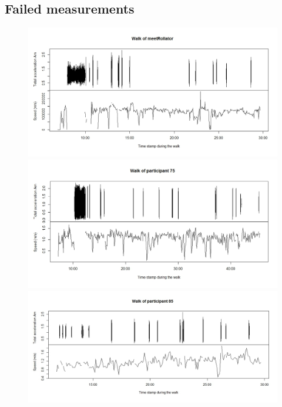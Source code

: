 \begin{appendix}
\clearpage

\section{Failed measurements}\label{Afailed}
\begin{figure}[H]
\includegraphics[width=\textwidth]{img/annex/walkmeetrollator.jpeg}
\includegraphics[width=\textwidth]{img/annex/walkpart75.jpeg}
\includegraphics[width=\textwidth]{img/annex/walkpart85.jpeg}
\end{figure}

\end{appendix}
